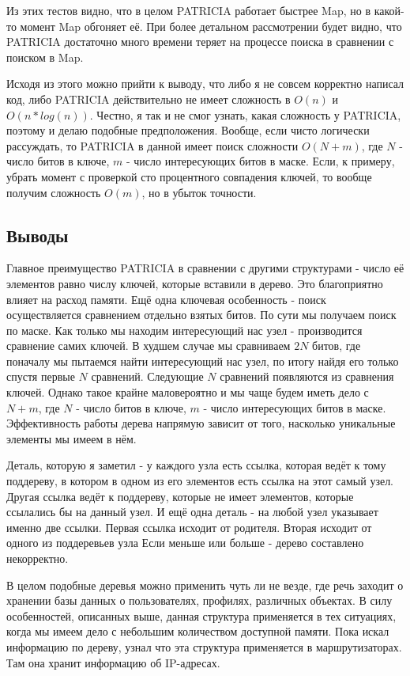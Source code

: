 \documentclass[12pt]{article}
\begin{document}
Из этих тестов видно, что в целом PATRICIA работает быстрее Map, но в какой-то момент Map обгоняет её. При более детальном рассмотрении будет видно, что PATRICIA достаточно много времени теряет на процессе поиска в сравнении с поиском в Map.

Исходя из этого можно прийти к выводу, что либо я не совсем корректно написал код, либо PATRICIA действительно не имеет сложность в $O(n)$ и $O(n*log(n))$. Честно, я так и не смог узнать, какая сложность у PATRICIA, поэтому и делаю подобные предположения. Вообще, если чисто логически рассуждать, то PATRICIA в данной имеет поиск сложности $O(N + m)$, где $N$ - число битов в ключе, $m$ - число интересующих битов в маске. Если, к примеру, убрать момент с проверкой сто процентного совпадения ключей, то вообще получим сложность $O(m)$, но в убыток точности.

\subsection*{Выводы}

Главное преимущество PATRICIA в сравнении с другими структурами - число её элементов равно числу ключей, которые вставили в дерево. Это благоприятно влияет на расход памяти. Ещё одна ключевая особенность - поиск осуществляется сравнением отдельно взятых битов. По сути мы получаем поиск по маске. Как только мы находим интересующий нас узел - производится сравнение самих ключей. В худшем случае мы сравниваем $2N$ битов, где поначалу мы пытаемся найти интересующий нас узел, по итогу найдя его только спустя первые $N$ сравнений. Следующие $N$ сравнений появляются из сравнения ключей. Однако такое крайне маловероятно и мы чаще будем иметь дело с $N + m$, где $N$ - число битов в ключе, $m$ - число интересующих битов в маске. Эффективность работы дерева напрямую зависит от того, насколько уникальные элементы мы имеем в нём.

Деталь, которую я заметил - у каждого узла есть ссылка, которая ведёт к тому поддереву, в котором в одном из его элементов есть ссылка на этот самый узел. Другая ссылка ведёт к поддереву, которые не имеет элементов, которые ссылались бы на данный узел. И ещё одна деталь - на любой узел указывает именно две ссылки. Первая ссылка исходит от родителя. Вторая исходит от одного из поддеревьев узла Если меньше или больше - дерево составлено некорректно.

В целом подобные деревья можно применить чуть ли не везде, где речь заходит о хранении базы данных о пользователях, профилях, различных объектах. В силу особенностей, описанных выше, данная структура применяется в тех ситуациях, когда мы имеем дело с небольшим количеством доступной памяти. Пока искал информацию по дереву, узнал что эта структура применяется в маршрутизаторах. Там она хранит информацию об IP-адресах.
\end{document}
